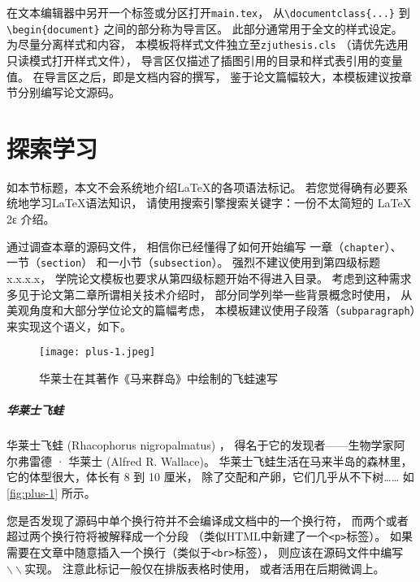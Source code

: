 在文本编辑器中另开一个标签或分区打开\texttt{main.tex}，
从\texttt{\textbackslash documentclass\{...\}}
到\texttt{\textbackslash begin\{document\}}
之间的部分称为导言区。
此部分通常用于全文的样式设定。
为尽量分离样式和内容，
本模板将样式文件独立至\texttt{zjuthesis.cls}
（请优先选用只读模式打开样式文件），
导言区仅描述了插图引用的目录和样式表引用的变量值。
在导言区之后，即是文档内容的撰写，
鉴于论文篇幅较大，本模板建议按章节分别编写论文源码。

\section{探索学习}
如本节标题，本文不会系统地介绍\LaTeX 的各项语法标记。
若您觉得确有必要系统地学习\LaTeX 语法知识，
请使用搜索引擎搜索关键字：一份不太简短的 LaTeX 2ε 介绍。

通过调查本章的源码文件，
相信你已经懂得了如何开始编写
一章（\texttt{chapter}）、
一节（\texttt{section}）
和一小节（\texttt{subsection}）。
强烈不建议使用到第四级标题x.x.x.x，
学院论文模板也要求从第四级标题开始不得进入目录。
考虑到这种需求多见于论文第二章所谓相关技术介绍时，
部分同学列举一些背景概念时使用，
从美观角度和大部分学位论文的篇幅考虑，
本模板建议使用子段落（\texttt{subparagraph}）来实现这个语义，如下。

\begin{figure}[htbp]
    \centering  %
    \texttt{[image: plus-1.jpeg]} %
    \caption{华莱士在其著作《马来群岛》中绘制的飞蛙速写} %
    \label{fig:plus-1} %
\end{figure}


\subparagraph{华莱士飞蛙} %
华莱士飞蛙 (Rhacophorus nigropalmatus) ，
得名于它的发现者——生物学家阿尔弗雷德 · 华莱士 (Alfred R. Wallace)。
华莱士飞蛙生活在马来半岛的森林里，
它的体型很大，体长有 8 到 10 厘米，
除了交配和产卵，它们几乎从不下树……
如\autoref{fig:plus-1} 所示。

您是否发现了源码中单个换行符并不会编译成文档中的一个换行符，
而两个或者超过两个换行符将被解释成一个分段
（类似HTML中新建了一个\texttt{<p>}标签）。
如果需要在文章中随意插入一个换行（类似于\texttt{<br>}标签），
则应该在源码文件中编写$\backslash\backslash$实现。
注意此标记一般仅在排版表格时使用，
或者活用在后期微调上。

